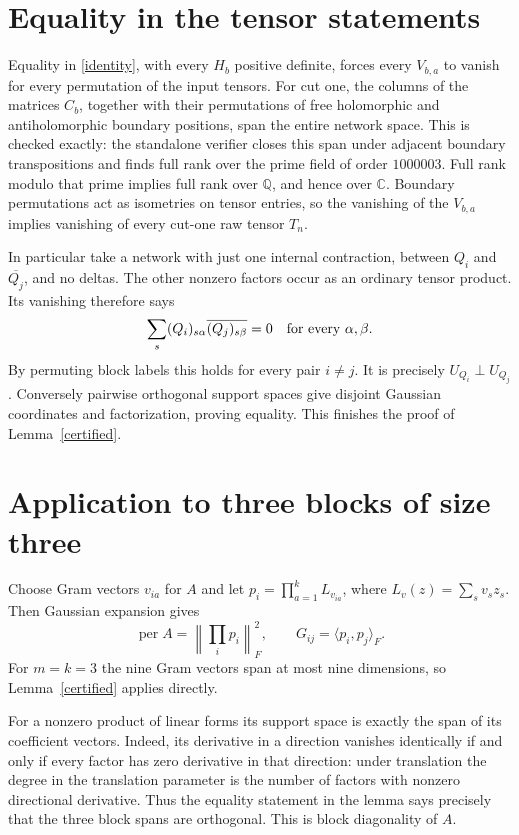 \documentclass[11pt]{article}
\newcommand{\per}{\operatorname{per}}
\begin{document}
\section{Equality in the tensor statements}
Equality in \eqref{identity}, with every $H_b$ positive definite, forces every
$V_{b,a}$ to vanish for every permutation of the input tensors.
For cut one, the columns of the matrices $C_b$, together with their
permutations of free holomorphic and antiholomorphic boundary positions,
span the entire network space. This is checked exactly: the standalone
verifier closes this span under adjacent boundary transpositions and finds
full rank over the prime field of order $1000003$. Full rank modulo that
prime implies full rank over $\mathbb Q$, and hence over $\mathbb C$.
Boundary permutations act as isometries on tensor entries, so the vanishing
of the $V_{b,a}$ implies vanishing of every cut-one raw tensor $T_n$.

In particular take a network with just one internal contraction, between
$Q_i$ and $\overline{Q_j}$, and no deltas. The other nonzero factors occur
as an ordinary tensor product. Its vanishing therefore says
\[
\sum_s(Q_i)_{s\alpha}\overline{(Q_j)_{s\beta}}=0
\quad\hbox{for every }\alpha,\beta.
\]
By permuting block labels this holds for every pair $i\ne j$. It is precisely
$U_{Q_i}\perp U_{Q_j}$. Conversely pairwise orthogonal support spaces give
disjoint Gaussian coordinates and factorization, proving equality. This
finishes the proof of Lemma~\ref{certified}.

\section{Application to three blocks of size three}
Choose Gram vectors $v_{ia}$ for $A$ and let
$p_i=\prod_{a=1}^kL_{v_{ia}}$, where $L_v(z)=\sum_s v_sz_s$.
Then Gaussian expansion gives
\[
\per A=\left\|\prod_i p_i\right\|_F^2,\qquad
G_{ij}=\langle p_i,p_j\rangle_F.
\]
For $m=k=3$ the nine Gram vectors span at most nine dimensions, so
Lemma~\ref{certified} applies directly.

For a nonzero product of linear forms its support space is exactly the span
of its coefficient vectors. Indeed, its derivative in a direction vanishes
identically if and only if every factor has zero derivative in that direction:
under translation the degree in the translation parameter is the number of
factors with nonzero directional derivative. Thus the equality statement in
the lemma says precisely that the three block spans are orthogonal. This is
block diagonality of $A$.
\end{document}
